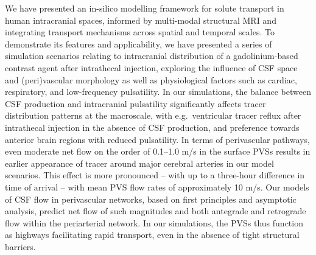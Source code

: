 \documentclass[fleqn,10pt]{wlscirep}
\begin{document}
We have presented an in-silico modelling framework for solute
transport in human intracranial spaces, informed by multi-modal
structural MRI and integrating transport mechanisms across spatial and
temporal scales. To demonstrate its features and applicability, we
have presented a series of simulation scenarios relating to
intracranial distribution of a gadolinium-based contrast agent after
intrathecal injection, exploring the influence of CSF space and
(peri)vascular morphology as well as physiological factors such as
cardiac, respiratory, and low-frequency pulsatility. In our
simulations, the balance between CSF production and intracranial
pulsatility significantly affects tracer distribution patterns at the
macroscale, with e.g.~ventricular tracer reflux after intrathecal
injection in the absence of CSF production, and preference towards
anterior brain regions with reduced pulsatility. In terms of
perivascular pathways, even moderate net flow on the order of 0.1--1.0
\textmu m/s in the surface PVSs results in earlier appearance of
tracer around major cerebral arteries in our model scenarios. This
effect is more pronounced -- with up to a three-hour difference in
time of arrival -- with mean PVS flow rates of approximately 10
\textmu m/s. Our models of CSF flow in perivascular networks, based on
first principles and asymptotic analysis, predict net flow of such
magnitudes and both antegrade and retrograde flow within the
periarterial network. In our simulations, the PVSs thus function as
highways facilitating rapid transport, even in the absence of tight
structural barriers.


\end{document}
